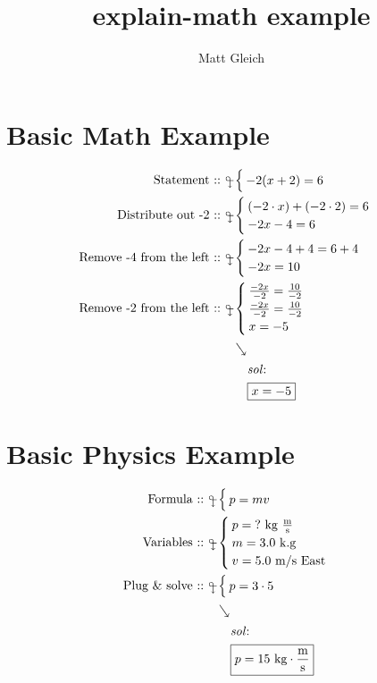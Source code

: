 \documentclass{report}
\title{explain-math example}
\author{Matt Gleich}
\date{}
\begin{document}
    \maketitle

    \section{Basic Math Example}
        \begin{align*}
            \statement{-2(x + 2) = 6}
            \explain{Distribute out -2}{
                \step{ (-2 \cdot x) + (-2 \cdot 2) = 6 }
                \step{ -2x - 4 = 6 }
            }
            \explain{Remove -4 from the left}{
                \step{ -2x - 4 + 4 = 6 + 4 }
                \step{ -2x = 10 }
            }
            \explain{Remove -2 from the left}{
                \step{ \frac{-2x}{-2} = \frac{10}{-2} }
                \step{ \frac{-2x}{-2} = \frac{10}{-2} }
                \step{ x = -5 }
            }
            \sol{x = -5}
        \end{align*}

    \section{Basic Physics Example}
        \begin{align*}
            \formula{p = mv}
            \variables{
                \varu{p}{\text{?}}{kg $ \frac{\text{m}}{\text{s}} $}
                \varu{m}{3.0}{k.g}
                \varu{v}{5.0}{m/s East}
            }
            \explain{Plug \& solve}{p = 3 \cdot 5}
            \sol{p = 15 \text{ kg} \cdot \frac{\text{m}}{\text{s}}}
        \end{align*}
\end{document}
